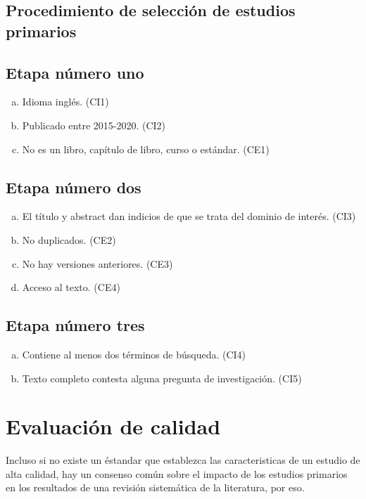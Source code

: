 \documentclass{article}
\begin{document}
\subsection{Procedimiento de selección de estudios primarios}

\subsection{Etapa número uno}
\begin{enumerate}[(a)]
  \item{Idioma inglés. (CI1)}
  \item{Publicado entre 2015-2020. (CI2)}
  \item{No es un libro, capítulo de libro, curso o estándar. (CE1)}
\end{enumerate}

\subsection{Etapa número dos}
\begin{enumerate}[(a)]
  \item{El título y abstract dan indicios de que se trata del dominio de interés. (CI3)}
  \item{No duplicados. (CE2)}
  \item{No hay versiones anteriores. (CE3) }
  \item{Acceso al texto. (CE4)}
\end{enumerate}

\subsection{Etapa número tres}
\begin{enumerate}[(a)]
  \item{Contiene al menos dos términos de búsqueda. (CI4)}
  \item{Texto completo contesta alguna pregunta de investigación. (CI5)}
\end{enumerate}
\newpage

\section{Evaluación de calidad}
Incluso si no existe un éstandar que establezca las caracteristicas de un estudio 
de alta calidad, hay un consenso común sobre el impacto de los estudios primarios 
en los resultados de una revisión sistemática de la literatura, por eso. 
\end{document}
